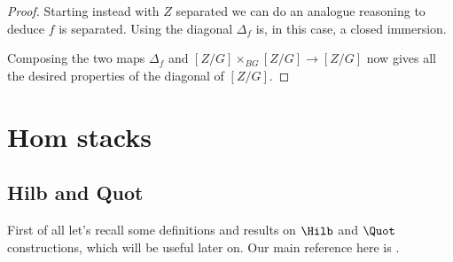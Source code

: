 \begin{proof}
                Starting instead with $Z$ separated we can do an analogue reasoning to deduce $f$ is separated. Using \cite[\href{https://stacks.math.columbia.edu/tag/04YS}{Lemma~04YS}]{stacks-project} the diagonal $\Delta_f$ is, in this case, a closed immersion.

                Composing the two maps $\Delta_f$ and $[Z/G] \times_{BG} [Z/G] \to [Z/G]$ now gives all the desired properties of the diagonal of $[Z/G]$.
            \end{proof}
    \section{Hom stacks}
        \subsection{Hilb and Quot}
            First of all let's recall some definitions and results on $\Hilb$ and $\Quot$ constructions, which will be useful later on. Our main reference here is \cite[Chapter~5]{Fant}.


